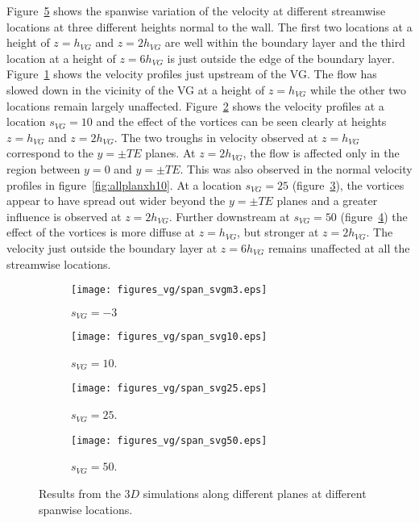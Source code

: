 Figure~\ref{fig:spanall} shows the spanwise variation of the velocity at different streamwise locations at three different heights normal to the wall. The first two locations at a height of $z=h_{VG}$ and $z=2h_{VG}$ are well within the boundary layer and the third location at a height of $z=6h_{VG}$ is just outside the edge of the boundary layer. Figure~\ref{fig:spanxhm3} shows the velocity profiles just upstream of the VG. The flow has slowed down in the vicinity of the VG at a height of $z=h_{VG}$ while the other two locations remain largely unaffected. Figure~\ref{fig:spanxh10} shows the velocity profiles at a location $s_{VG}=10$ and the effect of the vortices can be seen clearly at heights $z=h_{VG}$ and $z=2h_{VG}$. The two troughs in velocity observed at $z=h_{VG}$ correspond to the $y=\pm TE$ planes. At $z=2h_{VG}$, the flow is affected only in the region between $y=0$ and $y=\pm TE$. This was also observed in the normal velocity profiles in figure~\ref{fig:allplanxh10}.
At a location $s_{VG}=25$ (figure~\ref{fig:spanxh25}), the vortices appear to have spread out wider beyond the $y=\pm TE$ planes and a greater influence is observed at $z=2h_{VG}$. Further downstream at $s_{VG}=50$ (figure~\ref{fig:spanxh50}) the effect of the vortices is more diffuse at $z=h_{VG}$, but stronger at $z=2h_{VG}$. The velocity just outside the boundary layer at $z=6h_{VG}$ remains unaffected at all the streamwise locations.
\begin{figure}[h!]
    \centering
    \captionsetup{justification=centering}
    \begin{subfigure}[b]{0.48\textwidth}
    \captionsetup{justification=centering}
        \texttt{[image: figures\_vg/span\_svgm3.eps]}
        \caption{$s_{VG} = -3$}
        \label{fig:spanxhm3}
    \end{subfigure}
    \begin{subfigure}[b]{0.48\textwidth}
    \centering
    \captionsetup{justification=centering}
        \texttt{[image: figures\_vg/span\_svg10.eps]}
        \caption{$s_{VG} = 10$.}
        \label{fig:spanxh10}
    \end{subfigure}
    \begin{subfigure}[b]{0.48\textwidth}
    \centering
    \captionsetup{justification=centering}
        \texttt{[image: figures\_vg/span\_svg25.eps]}
        \caption{$s_{VG} = 25$.}
        \label{fig:spanxh25}
    \end{subfigure}
    \begin{subfigure}[b]{0.48\textwidth}
    \centering
    \captionsetup{justification=centering}
        \texttt{[image: figures\_vg/span\_svg50.eps]}
        \caption{$s_{VG} = 50$.}
        \label{fig:spanxh50}
    \end{subfigure}
    \caption{Results from the $3D$ simulations along different planes at different spanwise locations.}
    \label{fig:spanall}
\end{figure}

